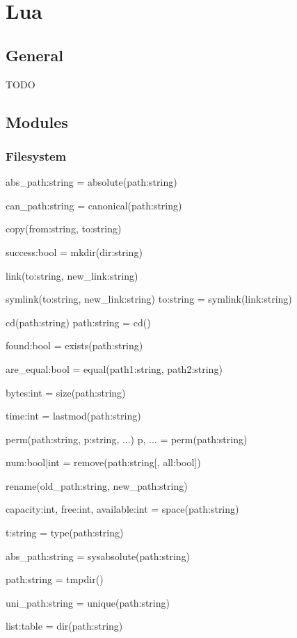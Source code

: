 \section{Lua}
\label{sec:lua}

\subsection{General}
\label{sec:general}

TODO

\subsection{Modules}
\label{sec:modules}

\subsubsection{Filesystem}
\label{sec:filesystem}

abs_path:string = absolute(path:string)

can_path:string = canonical(path:string)

copy(from:string, to:string)

success:bool = mkdir(dir:string)

link(to:string, new_link:string)

symlink(to:string, new_link:string)
to:string = symlink(link:string)

cd(path:string)
path:string = cd()

found:bool = exists(path:string)

are_equal:bool = equal(path1:string, path2:string)

bytes:int = size(path:string)

time:int = lastmod(path:string)

perm(path:string, p:string, ...)
p, ... = perm(path:string)

num:bool|int = remove(path:string[, all:bool])

rename(old_path:string, new_path:string)

capacity:int, free:int, available:int = space(path:string)

t:string = type(path:string)

abs_path:string = sysabsolute(path:string)

path:string = tmpdir()

uni_path:string = unique(path:string)

list:table = dir(path:string)

